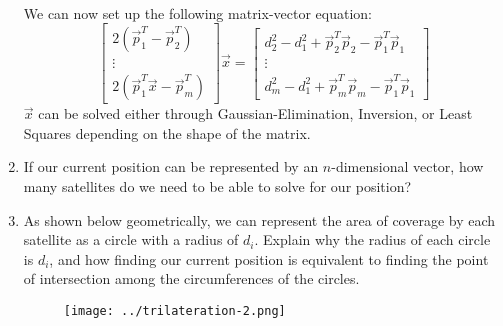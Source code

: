 \begin{enumerate}
{\begin{align*}
        \end{align*}
        We can now set up the following matrix-vector equation:
        \[
            \begin{bmatrix} 
            2 (\vec{p}_{1}^{T} - \vec{p}_{2}^{T}) \\
            \vdots \\
            2 (\vec{p}_{1}^{T} \vec{x} - \vec{p}_{m}^{T})
            \end{bmatrix} \vec{x} = 
            \begin{bmatrix} 
            d_{2}^{2} - d_{1}^{2} + \vec{p}_{2}^{T} \vec{p}_{2} - \vec{p}_{1}^{T} \vec{p}_{1}\\
            \vdots \\
            d_{m}^{2} - d_{1}^{2} + \vec{p}_{m}^{T} \vec{p}_{m} - \vec{p}_{1}^{T} \vec{p}_{1}
            \end{bmatrix}
        \]
        $\vec{x}$ can be solved either through Gaussian-Elimination, Inversion, or Least Squares depending on the shape of the matrix.
    }

    \item If our current position can be represented by an $n$-dimensional vector, how many satellites do we need to be able to solve for our position?

    \answerbox{1cm}

    \item As shown below geometrically, we can represent the area of coverage by each satellite as a circle with a radius of $d_i$. Explain why the radius of each circle is $d_i$, and how finding our current position is equivalent to finding the point of intersection among the circumferences of the circles.
    \begin{figure}[H]
        \centering
        \texttt{[image: ../trilateration-2.png]}
    \end{figure}

    \answerbox{4cm}



\end{enumerate}

